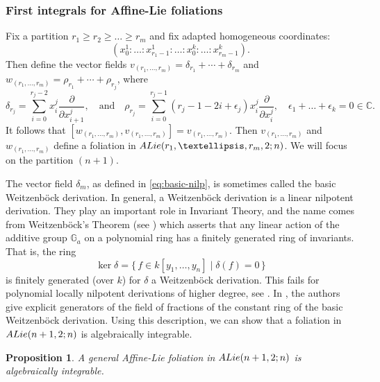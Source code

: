 \documentclass[twoside]{amsart}
\numberwithin{equation}{section}
\def\CC{{\mathbb{C}}}
\newcommand{\del}[1]{\frac{\partial}{\partial #1}}
\newcommand{\exc}[3]{{\rm ALie}(#1,#2;#3)}
\newtheorem{proposition}[theorem]{Proposition}
\theoremstyle{definition}
\begin{document}
\subsubsection{First integrals for  Affine-Lie foliations}\label{normal-form-poisson}
Fix a partition $r_1 \geq r_2 \geq \dots \geq r_m$ and fix adapted homogeneous coordinates:
\[
(x_0^1: \dots: x_{r_1-1}^1: \dots : x_0^k : \dots : x_{r_m-1}^k).
\]
Then define the vector fields $v_{(r_1, \dots, r_m)} = \delta_{r_1} + \cdots + \delta_{r_m} $ and $w_{(r_1, \dots, r_m)} = \rho_{r_1} + \cdots + \rho_{r_j}$, where
\begin{equation}\label{eq:basic-nilp}
    \delta_{r_j} = \sum_{i=0}^{r_j-2} x_{i}^j \del{ x_{i+1}^j}, \quad \text{and} \quad \rho_{r_j} = \sum_{i =0}^{ r_j-1} (r_j-1 - 2i + \epsilon_j) x_i^j\del{ x_{i}^j}, \quad \epsilon_1+ \dots +  \epsilon_k = 0 \in \CC.
\end{equation}
It follows that $[w_{(r_1, \dots, r_m)}, v_{(r_1, \dots, r_m)}] = v_{(r_1, \dots, r_m)}$. Then $v_{(r_1, \dots, r_m)}$ and $w_{(r_1, \dots, r_m)}$ define a foliation in $\exc{r_1, \dots, r_m}{2}{n}$. We will focus on the partition $(n+1)$.


The vector field $\delta_{m}$, as defined in \eqref{eq:basic-nilp}, is sometimes called the basic Weitzenb\"ock derivation. In general, a Weitzenb\"ock derivation is a linear nilpotent derivation. They play an important role in Invariant Theory, and the name comes from Weitzenb\"ock's Theorem (see \cite{Se}) which asserts that any linear action of the additive group $\mathbb{G}_a$ on a polynomial ring has a finitely generated ring of invariants. That is, the ring 
\[
\ker \delta = \{\, f\in k[y_1, \dots,y_n] \mid \delta(f) = 0\,\}
\]
is finitely generated (over $k$) for $\delta$ a Weitzenb\"ock derivation. This fails for polynomial locally nilpotent derivations of higher degree, see \cite[Example 6.3.1]{Now}. In \cite{JS}, the authors give explicit generators of the field of fractions of the constant ring of the basic Weitzenb\"ock derivation. Using this description, we can show that a foliation in $\exc{n+1}{2}{n}$ is algebraically integrable.

\begin{proposition}\label{prop:aff-alg-int}
A general Affine-Lie foliation in $\exc{n+1}{2}{n}$ is algebraically integrable.
\end{proposition}
\end{document}
